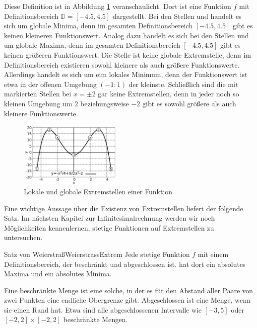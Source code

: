 Diese Definition ist in Abbildung \ref{fig:ExtrValFun} veranschaulicht. Dort ist eine Funktion $f$ mit Definitionsbereich $\mathbb{D} = [-4.5, 4.5]$ dargestellt. Bei den Stellen  und  handelt es sich um globale Minima, denn im gesamten Definitionsbereich $[-4.5,4.5]$ gibt es keinen kleineren Funktionswert. Analog dazu handelt es sich bei den Stellen  und  um globale Maxima, denn im gesamten Definitionsbereich $[-4.5,4.5]$ gibt es keinen größeren Funktionswert. Die Stelle  ist keine globale Extremstelle, denn im Definitionsbereich existieren sowohl kleinere als auch größere Funktionswerte. Allerdings handelt es sich um eim lokales Minimum, denn der Funktionswert ist etwa in der offenen Umgebung $(-1:1)$ der kleinste. Schließlich sind die mit  markierten Stellen bei $x=\pm 2$ gar keine Extremstellen, denn in jeder noch so kleinen Umgebung um $2$ beziehungsweise $-2$ gibt es sowohl größere als auch kleinere Funktionswerte.

\begin{figure}
    \centering
    \includegraphics[width=0.45\textwidth]{./gnuplot/extreme-values-function}
    \caption{Lokale und globale Extremstellen einer Funktion}
    \label{fig:ExtrValFun}
\end{figure}

Eine wichtige Aussage über die Existenz von Extremstellen liefert der folgende Satz. Im nächsten Kapitel zur Infinitesimalrechnung werden wir noch Möglichkeiten kennenlernen, stetige Funktionen auf Extremstellen zu untersuchen.

\begin{statement}{Satz von Weierstraß}{WeierstrassExtrem}
    Jede stetige Funktion $f$ mit einem Definitionsbereich, der beschränkt und abgeschlossen ist, hat dort ein absolutes Maxima und ein absolutes Minima.
\end{statement}

Eine beschränkte Menge ist eine solche, in der es für den Abstand aller Paare von zwei Punkten eine endliche Obergrenze gibt. Abgeschlossen ist eine Menge, wenn sie einen Rand hat. Etwa sind alle abgeschlossenen Intervalle wie $[-3,5]$ oder $[-2,2]\times[-2,2]$ beschränkte Mengen.

